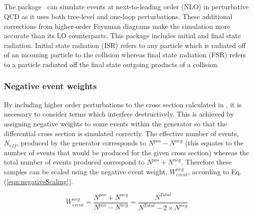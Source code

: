 \subsection{\aMCATNLO}
The \aMCATNLO package~\cite{Degrande:2014sta} can simulate events at next-to-leading order (NLO) in perturbative QCD as it uses both tree-level and one-loop perturbations. These additional corrections from higher-order Feynman diagrams make the simulation more accurate than its LO counterparts. This package includes initial and final state radiation. Initial state radiation (ISR) refers to any particle which is radiated off of an incoming particle to the collision whereas final state radiation (FSR) refers to a particle radiated off the final state outgoing products of a collision.\\
\subsubsection{Negative event weights}
By including higher order perturbations to the cross section calculated in \aMCATNLO, it is necessary to consider terms which interfere destructively. This is achieved by assigning negative weights to some events within the generator so that the differential cross section is simulated correctly. The effective number of events, $N_{eff}$, produced by the generator corresponds to $N^{pos} - N^{neg}$ (this equates to the number of events that would be produced for the given cross section) whereas the total number of events produced correspond to $N^{pos} + N^{neg}$. Therefore these samples can be scaled using the negative event weight, $W_{event}^{neg}$, according to Eq. (\ref{eqn:negativeScaling}).

\begin{equation}
\label{eqn:negativeScaling}
W_{event}^{neg} = \frac{N^{pos} + N^{neg}}{N^{pos} - N^{neg}} = \frac{N^{Total}}{ N^{Total} - 2\times N^{neg}}
\end{equation}


